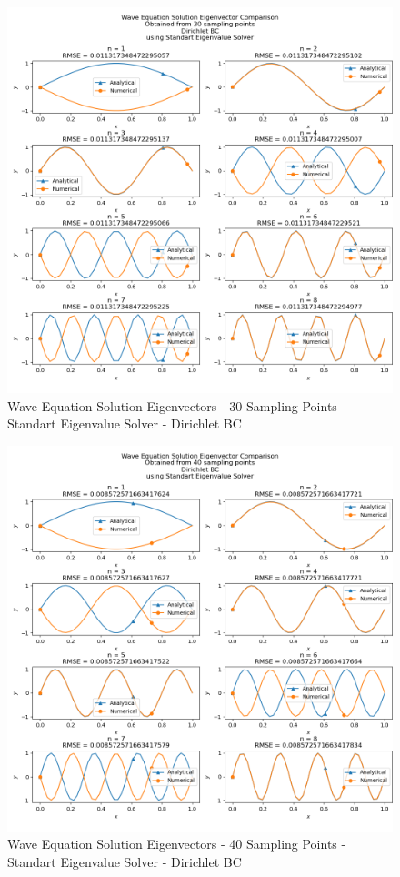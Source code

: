 \documentclass[letterpaper,12pt]{article}
\begin{document}
\begin{figure}[H]
\centerline{\includegraphics[width=\linewidth]{figures/1_30_Standart_Eigenvalue_Solver_d_eigenvector.png}}
\caption{Wave Equation Solution Eigenvectors - 30 Sampling Points - Standart Eigenvalue Solver - Dirichlet BC}
\label{fig:1_30_Standart_Eigenvalue_Solver_d_eigenvector}
\end{figure}

\begin{figure}[H]
\centerline{\includegraphics[width=\linewidth]{figures/1_40_Standart_Eigenvalue_Solver_d_eigenvector.png}}
\caption{Wave Equation Solution Eigenvectors - 40 Sampling Points - Standart Eigenvalue Solver - Dirichlet BC}
\label{fig:1_40_Standart_Eigenvalue_Solver_d_eigenvector}
\end{figure}
\end{document}
